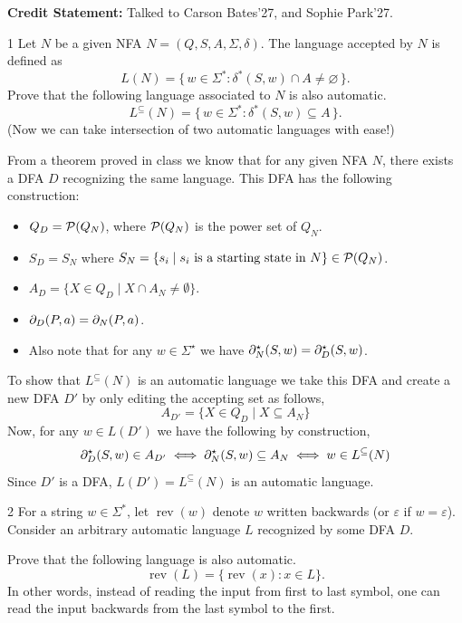 \documentclass[12pt]{article}
\begin{document}


\textbf{Credit Statement:} Talked to Carson Bates'27, and Sophie Park'27. 

\begin{problem}{1}
    Let $N$ be a given NFA $N=(Q,S,A,\Sigma,\delta)$.  
    The language accepted by $N$ is defined as  
    \[
    L(N)=\{\,w\in\Sigma^{*} : \delta^{*}(S,w)\cap A\neq\varnothing\,\}.
    \]
    Prove that the following language associated to $N$ is also automatic.  
    \[
    L^{\subseteq}(N)=\{\,w\in\Sigma^{*} : \delta^{*}(S,w)\subseteq A\,\}.
    \]
    (Now we can take intersection of two automatic languages with ease!)
\end{problem}

\begin{solution}
    \bbni 

    From a theorem proved in class we know that for any given NFA $N$, there exists a DFA $D$ recognizing the same language. This DFA has the following construction: 
    \begin{itemize}
        \item $Q_D = \mathcal{P}(Q_N)$, where $\mathcal{P}(Q_N)$ is the power set of $Q_N$. 
        \item $S_D = S_N$ where $S_N = \{s_i \mid s_i \text{ is a starting state in } N\} \in \mathcal{P}(Q_N)$. 
        \item $A_D = \{X \in Q_D \mid X \cap A_N \neq \emptyset\}$.
        \item $\partial_D(P, a) = \partial_N(P, a)$. 
        \item Also note that for any $w \in \Sigma^\star$ we have $\partial^\star_N(S, w) = \partial^\star_D(S, w)$.
    \end{itemize}

    To show that $L^\subseteq(N)$ is an automatic language we take this DFA and create a new DFA $D'$ by only editing the accepting set as follows, 
    \[A_{D'} = \{X \in Q_D \mid X \subseteq A_N\}\]
    Now, for any $w \in L(D')$ we have the following by construction, 
    \[\partial^\star_D(S,w) \in A_{D'} \iff  \partial^\star_N(S,w) \subseteq A_N \iff w \in L^\subseteq(N)\]
    Since $D'$ is a DFA, $L(D') =  L^\subseteq(N)$ is an automatic language. 
\end{solution}

\newpage

\begin{problem}{2}
    For a string $w\in\Sigma^{*}$, let $\operatorname{rev}(w)$ denote $w$ written backwards (or $\varepsilon$ if $w=\varepsilon$).  
    Consider an arbitrary automatic language $L$ recognized by some DFA $D$.  

    Prove that the following language is also automatic.  
    \[
    \operatorname{rev}(L)=\{\operatorname{rev}(x) : x\in L\}.
    \]
    In other words, instead of reading the input from first to last symbol, one can read the input backwards from the last symbol to the first.
\end{problem}
\end{document}
